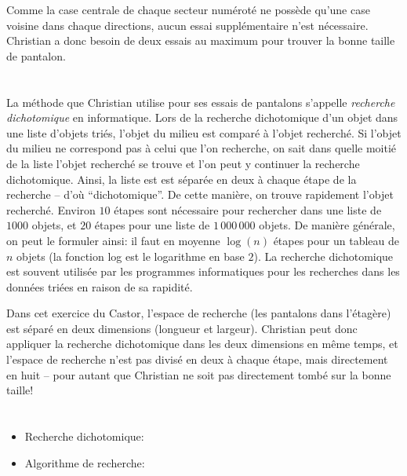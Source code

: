 {{Comme la case centrale de chaque secteur numéroté ne possède qu’une case voisine dans chaque directions, aucun essai supplémentaire n’est nécessaire. Christian a donc besoin de deux essais au maximum pour trouver la bonne taille de pantalon.



\section*{\BrochureItsInformatics}
La méthode que Christian utilise pour ses essais de pantalons s’appelle \emph{recherche dichotomique} en informatique. Lors de la recherche dichotomique d’un objet dans une liste d’objets triés, l’objet du milieu est comparé à l’objet recherché. Si l’objet du milieu ne correspond pas à celui que l’on recherche, on sait dans quelle moitié de la liste l’objet recherché se trouve et l’on peut y continuer la recherche dichotomique. Ainsi, la liste est est séparée en deux à chaque étape de la recherche – d’où “dichotomique”. De cette manière, on trouve rapidement l’objet recherché. Environ $10$ étapes sont nécessaire pour rechercher dans une liste de $1000$ objets, et $20$ étapes pour une liste de ${1\,000\,000}$ objets. De manière générale, on peut le formuler ainsi: il faut en moyenne ${\log(n)}$ étapes pour un tableau de ${n}$ objets (la fonction log est le logarithme en base $2$). La recherche dichotomique est souvent utilisée par les programmes informatiques pour les recherches dans les données triées en raison de sa rapidité.

Dans cet exercice du Castor, l’espace de recherche (les pantalons dans l’étagère) est séparé en deux dimensions (longueur et largeur). Christian peut donc appliquer la recherche dichotomique dans les deux dimensions en même temps, et l’espace de recherche n’est pas divisé en deux à chaque étape, mais directement en huit – pour autant que Christian ne soit pas directement tombé sur la bonne taille!



\section*{\BrochureWebsitesAndKeywords}
{\raggedright
\begin{itemize}
  \item Recherche dichotomique: \href{https://fr.wikipedia.org/wiki/Recherche_dichotomique}{}
  \item Algorithme de recherche: \href{https://fr.wikipedia.org/wiki/Algorithme_de_recherche}{}
\end{itemize}


}}}
